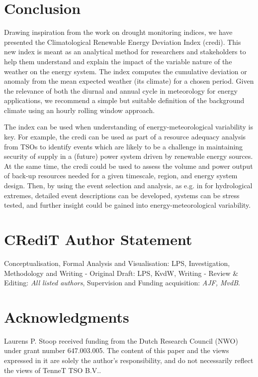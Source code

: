 \documentclass[a4paper,11pt]{extarticle}
\newcommand{\credi}[0]{{\sc credi}}
\begin{document}
\section{Conclusion}\label{secCP2:conclusion}
Drawing inspiration from the work on drought monitoring indices, we have presented the Climatological Renewable Energy Deviation Index (\credi{}). 
This new index is meant as an analytical method for researchers and stakeholders to help them understand and explain the impact of the variable nature of the weather on the energy system. 
The index computes the cumulative deviation or anomaly from the mean expected weather (its climate) for a chosen period. 
Given the relevance of both the diurnal and annual cycle in meteorology for energy applications, we recommend a simple but suitable definition of the background climate using an hourly rolling window approach. 

The index can be used when understanding of energy-meteorological variability is key. 
For example, the \credi{} can be used as part of a resource adequacy analysis from TSOs to identify events which are likely to be a challenge in maintaining security of supply in a (future) power system driven by renewable energy sources. 
At the same time, the \credi{} could be used to assess the volume and power output of back-up resources needed for a given timescale, region, and energy system design.
Then, by using the event selection and analysis, as e.g. in \textcite{vanderWiel2021} for hydrological extremes, detailed event descriptions can be developed, systems can be stress tested, and further insight could be gained into energy-meteorological variability.







\section*{CRediT Author Statement}
Conceptualisation, Formal Analysis and Visualisation: LPS, Investigation, Methodology and Writing - Original Draft: LPS, KvdW, Writing - Review \& Editing: \emph{All listed authors}, Supervision and Funding acquisition: \emph{AJF, MvdB}. 

\section*{Acknowledgments}
Laurens P. Stoop received funding from the  Dutch Research Council (NWO) under grant number 647.003.005. 
The content of this paper and the views expressed in it are solely the author’s responsibility, and do not necessarily reflect the views of TenneT TSO B.V..
\end{document}
